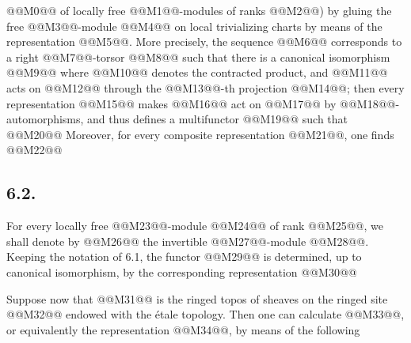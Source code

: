 
@@M0@@ of locally free @@M1@@-modules of ranks @@M2@@) by gluing the free @@M3@@-module @@M4@@ on local trivializing charts by means of the representation @@M5@@. More precisely, the sequence @@M6@@ corresponds to a right @@M7@@-torsor @@M8@@ such that there is a canonical isomorphism
@@M9@@
where @@M10@@ denotes the contracted product, and @@M11@@ acts on @@M12@@ through the @@M13@@-th projection @@M14@@; then every representation
@@M15@@
makes @@M16@@ act on @@M17@@ by @@M18@@-automorphisms, and thus defines a multifunctor @@M19@@ such that
@@M20@@
Moreover, for every composite representation @@M21@@, one finds
@@M22@@

\subsection*{6.2.}
For every locally free @@M23@@-module @@M24@@ of rank @@M25@@, we shall denote by @@M26@@ the invertible @@M27@@-module @@M28@@. Keeping the notation of 6.1, the functor @@M29@@ is determined, up to canonical isomorphism, by the corresponding representation
@@M30@@

Suppose now that @@M31@@ is the ringed topos of sheaves on the ringed site @@M32@@ endowed with the étale topology. Then one can calculate @@M33@@, or equivalently the representation @@M34@@, by means of the following
